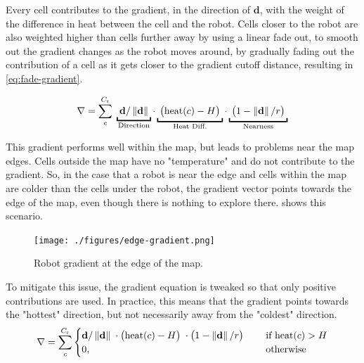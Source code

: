 Every cell contributes to the gradient, in the direction of $\mathbf{d}$, with the weight of the difference in heat between the cell and the robot. Cells closer to the robot are also weighted higher than cells further away by using a linear fade out, to smooth out the gradient changes as the robot moves around, by gradually fading out the contribution of a cell as it gets closer to the gradient cutoff distance, resulting in \cref{eq:fade-gradient}.

\begin{equation}
    \nabla = \sum_c^{C_\mathrm{r}} \;
    \underbracket{\; \mathbf{d}/\norm{\mathbf{d}}      \;}_\text{\makebox[0pt]{Direction}} \cdot
    \underbracket{\; \big(\mathrm{heat}(c) - H\big)    \;}_\text{Heat Diff.} \cdot
    \underbracket{\; \big(1 - \norm{\mathbf{d}}/r\big) \;}_\text{Nearness}
    \label{eq:fade-gradient}
\end{equation}

This gradient performs well within the map, but leads to problems near the map edges. Cells outside the map have no "temperature" and do not contribute to the gradient. {\color{red}So}, in the case that a robot is near the edge and cells within the map are colder than the cells under the robot, the gradient vector points towards the edge of the map, even though there is nothing to explore there.  shows this scenario.
\begin{figure}[h]
    \begin{center}
        \texttt{[image: ./figures/edge-gradient.png]}
    \end{center}
    \caption{Robot gradient at the edge of the map.}
    \label{fig:edge-gradient}
\end{figure}

To mitigate this issue, the gradient equation is tweaked so that only positive contributions are used. In practice, this means that the gradient points towards the "hottest" direction, but not necessarily away from the "coldest" direction.
\begin{equation}
\label{eq:robot-gradient}
    \nabla = \sum_c^{C_\mathrm{r}}
    \begin{cases}
        \mathbf{d}/\left\lVert\mathbf{d}\right\rVert      \; \cdot
        \big(\mathrm{heat}(c) - H\big)    \; \cdot
        \big(1 - \left\lVert\mathbf{d}\right\rVert/r\big) \; \quad &\text{if } \mathrm{heat}(c) > H
        \\
        0, \quad &\text{otherwise}
    \end{cases}
\end{equation}

